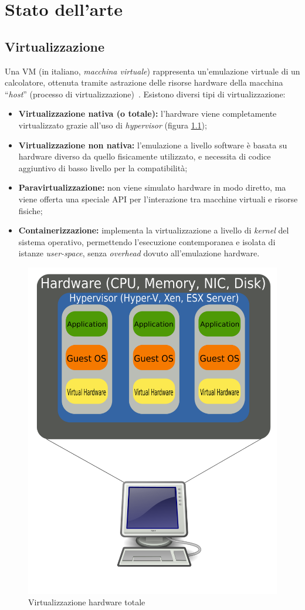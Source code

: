 \documentclass[12pt,a4paper,twoside,openright]{book}
\begin{document}
\chapter{Stato dell'arte} %
\section{Virtualizzazione}
Una \acf{VM} (in italiano, \textit{macchina virtuale}) rappresenta un'emulazione virtuale di un calcolatore, ottenuta tramite astrazione delle risorse hardware della macchina ``\textit{host}'' (processo di virtualizzazione)~\cite{virtualizationwiki}. Esistono diversi tipi di virtualizzazione:
\begin{itemize}
    \item \textbf{Virtualizzazione nativa (o totale):} l'hardware viene completamente virtualizzato grazie all'uso di \textit{hypervisor} (figura \ref{fig:full-virtualization});
    \item \textbf{Virtualizzazione non nativa:} l'emulazione a livello software è basata su hardware diverso da quello fisicamente utilizzato, e necessita di codice aggiuntivo di basso livello per la compatibilità;
    \item \textbf{Paravirtualizzazione:} non viene simulato hardware in modo diretto, ma viene offerta una speciale \ac{API} per l'interazione tra macchine virtuali e risorse fisiche;
    \item \textbf{Containerizzazione:} implementa la virtualizzazione a livello di \textit{kernel} del sistema operativo, permettendo l'esecuzione contemporanea e isolata di istanze \textit{user-space}, senza \textit{overhead} dovuto all'emulazione hardware.
\end{itemize}
\begin{figure}[ht]
    \centering
    \includegraphics[width=0.5\linewidth]{images/full_virtualization.png}
    \caption{Virtualizzazione hardware totale~\cite{virtualizationwiki}}
    \label{fig:full-virtualization}
\end{figure}
\end{document}
